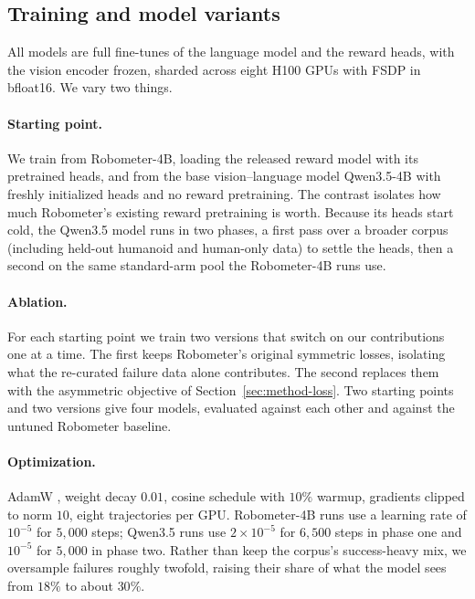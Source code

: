 \subsection{Training and model variants}
\label{sec:method-training}

All models are full fine-tunes of the language model and the reward heads, with
the vision encoder frozen, sharded across eight H100 GPUs with FSDP in bfloat16.
We vary two things.

\paragraph{Starting point.} We train from Robometer-4B, loading the released
reward model with its pretrained heads, and from the base vision--language model
Qwen3.5-4B \citep{team_qwen35-omni_2026} with freshly initialized heads and no
reward pretraining. The contrast isolates how much Robometer's existing reward
pretraining is worth. Because its heads start cold, the Qwen3.5 model runs in two
phases, a first pass over a broader corpus (including held-out humanoid and
human-only data) to settle the heads, then a second on the same standard-arm pool
the Robometer-4B runs use.

\paragraph{Ablation.} For each starting point we train two versions that switch
on our contributions one at a time. The first keeps Robometer's original
symmetric losses, isolating what the re-curated failure data alone contributes.
The second replaces them with the asymmetric objective of
Section~\ref{sec:method-loss}. Two starting points and two versions give four
models, evaluated against each other and against the untuned Robometer baseline.

\paragraph{Optimization.} AdamW \citep{loshchilov_decoupled_2019}, weight decay
$0.01$, cosine schedule with $10\%$ warmup, gradients clipped to norm $10$, eight
trajectories per GPU. Robometer-4B runs use a learning rate of $10^{-5}$ for
$5{,}000$ steps; Qwen3.5 runs use $2\times10^{-5}$ for $6{,}500$ steps in phase
one and $10^{-5}$ for $5{,}000$ in phase two. Rather than keep the corpus's
success-heavy mix, we oversample failures roughly twofold, raising their share of
what the model sees from $18\%$ to about $30\%$.
